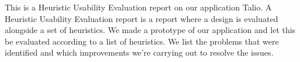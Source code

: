 This is a Heuristic Usability Evaluation report on our application Talio. A Heuristic Usability Evaluation report is a report where a design is evaluated alongside a set of heuristics. We made a prototype of our application and let this be evaluated according to a list of heuristics. We list the problems that were identified and which improvements we're carrying out to resolve the issues.